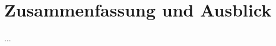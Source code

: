 \documentclass[german,version-2020-11]{uzl-thesis}
\begin{document}
\chapter{Zusammenfassung und Ausblick}%


%



...



%
\end{document}

